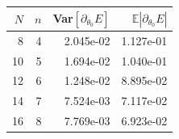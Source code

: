\begin{tabular}{r r r r}
\toprule
$N$ & $n$ & Var$[\partial_{\theta_0}E]$ & $\mathbb{E}|\partial_{\theta_0}E|$ \\
\midrule
8 & 4 & 2.045e-02 & 1.127e-01 \\
10 & 5 & 1.694e-02 & 1.040e-01 \\
12 & 6 & 1.248e-02 & 8.895e-02 \\
14 & 7 & 7.524e-03 & 7.117e-02 \\
16 & 8 & 7.769e-03 & 6.923e-02 \\
\bottomrule
\end{tabular}
